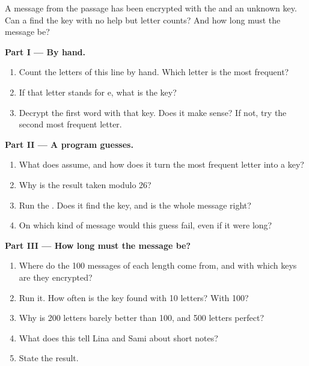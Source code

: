 \begin{problem}\label{pb:g9:first-cryptography:1}
A message from the passage has been encrypted with the  and an
unknown key. Can a  find the key with no help but letter counts? And how
long must the message be?

\medskip\noindent\textbf{Part I --- By hand.}

\label{lst:g9:first-cryptography:guess-shift}

\label{out:g9:first-cryptography:cipher-line}

\begin{enumerate}
  \item Count the letters of this line by hand. Which letter is the most frequent?
  \item If that letter stands for e, what is the key?
  \item Decrypt the first word with that key. Does it make sense? If not, try
    the second most frequent letter.
\end{enumerate}

\medskip\noindent\textbf{Part II --- A program guesses.}
\begin{enumerate}[resume]
  \item What does  assume, and how does it turn the most frequent
    letter into a key?
  \item Why is the result taken modulo 26?
  \item Run the . Does it find the key, and is the whole message right?
  \item On which kind of message would this guess fail, even if it were long?
\end{enumerate}

\medskip\noindent\textbf{Part III --- How long must the message be?}

\label{lst:g9:first-cryptography:short}

\begin{enumerate}[resume]
  \item Where do the 100 messages of each length come from, and with which keys
    are they encrypted?
  \item Run it. How often is the key found with 10 letters? With 100?
  \item Why is 200 letters barely better than 100, and 500 letters perfect?
  \item What does this tell Lina and Sami about short notes?
  \item State the result.
\end{enumerate}
\end{problem}
